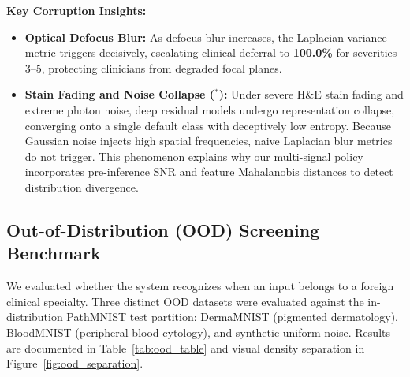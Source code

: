 \documentclass[11pt,a4paper]{article}
\begin{document}
\noindent\textbf{Key Corruption Insights:}
\begin{itemize}[leftmargin=*,itemsep=1pt,topsep=2pt]
    \item \textbf{Optical Defocus Blur:} As defocus blur increases, the Laplacian variance metric triggers decisively, escalating clinical deferral to \textbf{100.0\%} for severities 3--5, protecting clinicians from degraded focal planes.
    \item \textbf{Stain Fading and Noise Collapse ($^*$):} Under severe H\&E stain fading and extreme photon noise, deep residual models undergo representation collapse, converging onto a single default class with deceptively low entropy. Because Gaussian noise injects high spatial frequencies, naive Laplacian blur metrics do not trigger. This phenomenon explains why our multi-signal policy incorporates pre-inference SNR and feature Mahalanobis distances to detect distribution divergence.
\end{itemize}

\subsection{Out-of-Distribution (OOD) Screening Benchmark}
We evaluated whether the system recognizes when an input belongs to a foreign clinical specialty. Three distinct OOD datasets were evaluated against the in-distribution PathMNIST test partition: DermaMNIST (pigmented dermatology), BloodMNIST (peripheral blood cytology), and synthetic uniform noise. Results are documented in Table~\ref{tab:ood_table} and visual density separation in Figure~\ref{fig:ood_separation}.
\end{document}
